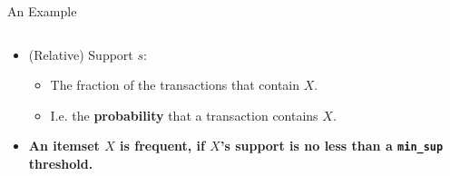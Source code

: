 \begin{frame}{An Example}
\begin{columns}
\begin{column}{0.5\textwidth}
\begin{itemize}
				\item (Relative) Support $s$:
				      \begin{itemize}
					      \item The fraction of the transactions that contain $X$.
					      \item I.e. the \textbf{probability} that a transaction
					            contains $X$.
				      \end{itemize}
				\item \textbf{An itemset $X$ is frequent, if $X$'s support is
					      no less than a \texttt{min\_sup} threshold.}
			\end{itemize}
		\end{column}
	\end{columns}
\end{frame}

